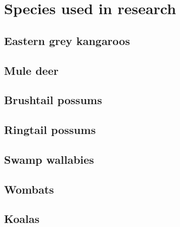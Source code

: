 \chapter{Species used in research}\label{apx:B}
\newpage

\section{Eastern grey kangaroos}

\section{Mule deer}

\section{Brushtail possums}

\section{Ringtail possums}

\section{Swamp wallabies}

\section{Wombats}

\section{Koalas}